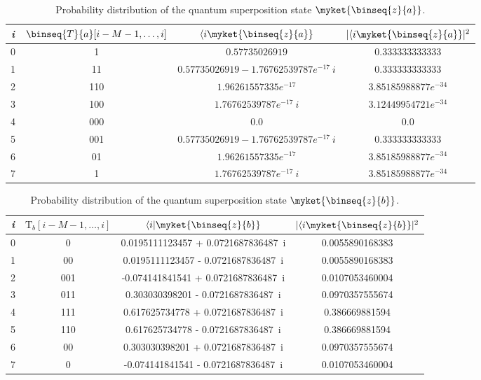 \begin{example}
	\begin{table}[h!]
		\begin{center}
		\begin{tabular}{|| c | c | c | c ||}
			\hline 
			\textit{i} & $\binseq{T}{a}[i-M-1,\ldots,i]$ & $\langle i \myket{\binseq{z}{a}}$ &  $\vert \langle i \myket{\binseq{z}{a}} \vert^2$\\
			\hline\hline
				0 & 1	  & $0.57735026919$ & 0.333333333333 \\
			\hline
				1 & 11   & $0.57735026919 - 1.76762539787e^{-17}\ i$ & 0.333333333333\\
			\hline
				2 & 110 & $1.96261557335e^{-17}$ & $3.85185988877e^{-34}$\\
			\hline
				3 & 100 & $1.76762539787e^{-17}\ i$   & $3.12449954721e^{-34}$\\
			\hline
				4 & 000 & 0.0  & 0.0\\
			\hline
				5 & 001 & $0.57735026919 - 1.76762539787e^{-17}\ i$  & 0.333333333333\\
			\hline
				6 & 01   & $1.96261557335e^{-17}$ & $3.85185988877e^{-34}$\\
			\hline
				7 & 1    & $1.76762539787e^{-17}\ i$  & $3.85185988877e^{-34}$\\
			\hline
		\end{tabular}
		\end{center}
		\caption{Probability distribution of the quantum superposition state $\myket{\binseq{z}{a}}$.}
		\label{tab:convolution-a}
	\end{table}
	
	\begin{table}[h!]
	\begin{center}
	\begin{tabular}{|| c | c | c | c ||}
		\hline 
		\textit{i} & $\text{T}_b [i-M-1,\ldots,i]$ & $\langle i \vert \myket{\binseq{z}{b}}$ &  $\vert \langle i \myket{\binseq{z}{b}} \vert^2$\\
		\hline\hline
			0 & 0	  & 0.0195111123457 + 0.0721687836487\ i & 0.0055890168383\\
		\hline
			1 & 00   & 0.0195111123457 - 0.0721687836487\ i & 0.0055890168383\\
		\hline
			2 & 001 & -0.074141841541 + 0.0721687836487\ i & 0.0107053460004\\
		\hline
			3 & 011 & 0.303030398201 - 0.0721687836487\ i   & 0.0970357555674\\
		\hline
			4 & 111 & 0.617625734778 + 0.0721687836487\ i  & 0.386669881594\\
		\hline
			5 & 110 & 0.617625734778 - 0.0721687836487\ i   & 0.386669881594\\
		\hline
			6 & 00   & 0.303030398201 + 0.0721687836487\ i  & 0.0970357555674\\
		\hline
			7 & 0    & -0.074141841541 - 0.0721687836487\ i  & 0.0107053460004\\
		\hline
	\end{tabular}
	\end{center}
	\caption{Probability distribution of the quantum superposition state $\myket{\binseq{z}{b}}$.}
	\label{tab:convolution-b}
	\end{table}
	

\end{example}
